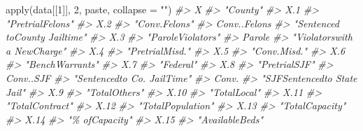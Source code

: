 \documentclass[
]{krantz}
\makeatletter
\newenvironment{Shaded}{\begin{snugshade}}{\end{snugshade}}
\newcommand{\AttributeTok}[1]{\textcolor[rgb]{0.61,0.61,0.61}{#1}}
\newcommand{\CommentTok}[1]{\textcolor[rgb]{0.37,0.37,0.37}{\textit{#1}}}
\newcommand{\DecValTok}[1]{\textcolor[rgb]{0.06,0.06,0.06}{#1}}
\newcommand{\FunctionTok}[1]{\textcolor[rgb]{0,0,0}{#1}}
\newcommand{\NormalTok}[1]{#1}
\newcommand{\StringTok}[1]{\textcolor[rgb]{0.5,0.5,0.5}{#1}}
\newenvironment{kframe}{%
\medskip{}
\setlength{\fboxsep}{.8em}
 \def\at@end@of@kframe{}%
 \ifinner\ifhmode%
  \def\at@end@of@kframe{\end{minipage}}%
  \begin{minipage}{\columnwidth}%
 \fi\fi%
 \def\FrameCommand##1{\hskip\@totalleftmargin \hskip-\fboxsep
 \colorbox{shadecolor}{##1}\hskip-\fboxsep
     \hskip-\linewidth \hskip-\@totalleftmargin \hskip\columnwidth}%
 \MakeFramed {\advance\hsize-\width
   \@totalleftmargin\z@ \linewidth\hsize
   \@setminipage}}%
 {\par\unskip\endMakeFramed%
 \at@end@of@kframe}
\renewenvironment{Shaded}{\begin{kframe}}{\end{kframe}}
\makeatother
\begin{document}
\begin{Shaded}
\begin{Highlighting}[]
\FunctionTok{apply}\NormalTok{(data[[}\DecValTok{1}\NormalTok{]], }\DecValTok{2}\NormalTok{, paste, }\AttributeTok{collapse =} \StringTok{""}\NormalTok{)}
\CommentTok{\#\textgreater{}                             X }
\CommentTok{\#\textgreater{}                      "County" }
\CommentTok{\#\textgreater{}                           X.1 }
\CommentTok{\#\textgreater{}              "PretrialFelons" }
\CommentTok{\#\textgreater{}                           X.2 }
\CommentTok{\#\textgreater{}                 "Conv.Felons" }
\CommentTok{\#\textgreater{}                  Conv..Felons }
\CommentTok{\#\textgreater{} "Sentenced toCounty Jailtime" }
\CommentTok{\#\textgreater{}                           X.3 }
\CommentTok{\#\textgreater{}             "ParoleViolators" }
\CommentTok{\#\textgreater{}                        Parole }
\CommentTok{\#\textgreater{}   "Violatorswith a NewCharge" }
\CommentTok{\#\textgreater{}                           X.4 }
\CommentTok{\#\textgreater{}               "PretrialMisd." }
\CommentTok{\#\textgreater{}                           X.5 }
\CommentTok{\#\textgreater{}                  "Conv.Misd." }
\CommentTok{\#\textgreater{}                           X.6 }
\CommentTok{\#\textgreater{}               "BenchWarrants" }
\CommentTok{\#\textgreater{}                           X.7 }
\CommentTok{\#\textgreater{}                     "Federal" }
\CommentTok{\#\textgreater{}                           X.8 }
\CommentTok{\#\textgreater{}                 "PretrialSJF" }
\CommentTok{\#\textgreater{}                     Conv..SJF }
\CommentTok{\#\textgreater{}    "Sentencedto Co. JailTime" }
\CommentTok{\#\textgreater{}                         Conv. }
\CommentTok{\#\textgreater{}   "SJFSentencedto State Jail" }
\CommentTok{\#\textgreater{}                           X.9 }
\CommentTok{\#\textgreater{}                 "TotalOthers" }
\CommentTok{\#\textgreater{}                          X.10 }
\CommentTok{\#\textgreater{}                  "TotalLocal" }
\CommentTok{\#\textgreater{}                          X.11 }
\CommentTok{\#\textgreater{}               "TotalContract" }
\CommentTok{\#\textgreater{}                          X.12 }
\CommentTok{\#\textgreater{}             "TotalPopulation" }
\CommentTok{\#\textgreater{}                          X.13 }
\CommentTok{\#\textgreater{}               "TotalCapacity" }
\CommentTok{\#\textgreater{}                          X.14 }
\CommentTok{\#\textgreater{}                "\% ofCapacity" }
\CommentTok{\#\textgreater{}                          X.15 }
\CommentTok{\#\textgreater{}               "AvailableBeds"}
\end{Highlighting}
\end{Shaded}
\end{document}
